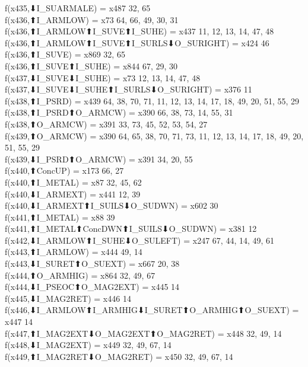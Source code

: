 f(x435,⬇I_SUARMALE) = x487 {32, 65} \\
f(x436,⬆I_ARMLOW) = x73 {64, 66, 49, 30, 31} \\
f(x436,⬆I_ARMLOW⬆I_SUVE⬆I_SUHE) = x437 {11, 12, 13, 14, 47, 48} \\
f(x436,⬆I_ARMLOW⬆I_SUVE⬆I_SURLS⬇O_SURIGHT) = x424 {46} \\
f(x436,⬆I_SUVE) = x869 {32, 65} \\
f(x436,⬆I_SUVE⬆I_SUHE) = x844 {67, 29, 30} \\
f(x437,⬇I_SUVE⬇I_SUHE) = x73 {12, 13, 14, 47, 48} \\
f(x437,⬇I_SUVE⬇I_SUHE⬆I_SURLS⬇O_SURIGHT) = x376 {11} \\
f(x438,⬆I_PSRD) = x439 {64, 38, 70, 71, 11, 12, 13, 14, 17, 18, 49, 20, 51, 55, 29} \\
f(x438,⬆I_PSRD⬆O_ARMCW) = x390 {66, 38, 73, 14, 55, 31} \\
f(x438,⬆O_ARMCW) = x391 {33, 73, 45, 52, 53, 54, 27} \\
f(x439,⬆O_ARMCW) = x390 {64, 65, 38, 70, 71, 73, 11, 12, 13, 14, 17, 18, 49, 20, 51, 55, 29} \\
f(x439,⬇I_PSRD⬆O_ARMCW) = x391 {34, 20, 55} \\
f(x440,⬆ConcUP) = x173 {66, 27} \\
f(x440,⬆I_METAL) = x87 {32, 45, 62} \\
f(x440,⬇I_ARMEXT) = x441 {12, 39} \\
f(x440,⬇I_ARMEXT⬆I_SUILS⬇O_SUDWN) = x602 {30} \\
f(x441,⬆I_METAL) = x88 {39} \\
f(x441,⬆I_METAL⬆ConcDWN⬆I_SUILS⬇O_SUDWN) = x381 {12} \\
f(x442,⬇I_ARMLOW⬆I_SUHE⬇O_SULEFT) = x247 {67, 44, 14, 49, 61} \\
f(x443,⬆I_ARMLOW) = x444 {49, 14} \\
f(x443,⬇I_SURET⬆O_SUEXT) = x667 {20, 38} \\
f(x444,⬆O_ARMHIG) = x864 {32, 49, 67} \\
f(x444,⬇I_PSEOC⬆O_MAG2EXT) = x445 {14} \\
f(x445,⬇I_MAG2RET) = x446 {14} \\
f(x446,⬇I_ARMLOW⬆I_ARMHIG⬇I_SURET⬆O_ARMHIG⬆O_SUEXT) = x447 {14} \\
f(x447,⬆I_MAG2EXT⬇O_MAG2EXT⬆O_MAG2RET) = x448 {32, 49, 14} \\
f(x448,⬇I_MAG2EXT) = x449 {32, 49, 67, 14} \\
f(x449,⬆I_MAG2RET⬇O_MAG2RET) = x450 {32, 49, 67, 14} \\
